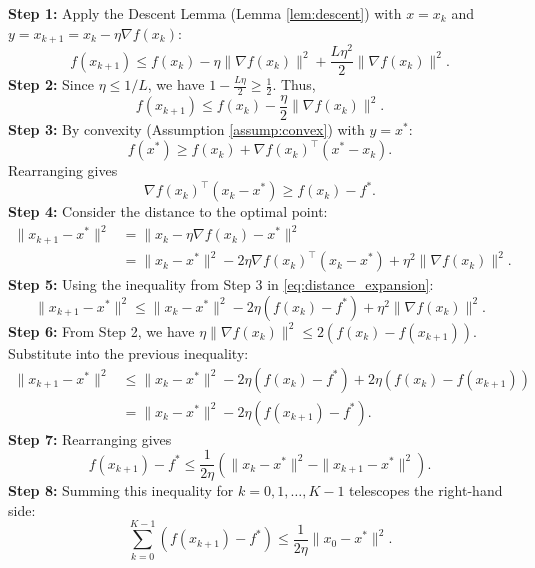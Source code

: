 \documentclass{article}
\begin{document}
\textbf{Step 1:} Apply the Descent Lemma (Lemma \ref{lem:descent}) with $x = x_k$ and $y = x_{k+1} = x_k - \eta \nabla f(x_k)$:
\begin{equation} \label{eq:descent_step}
    f(x_{k+1}) \le f(x_k) - \eta \|\nabla f(x_k)\|^2 + \frac{L \eta^2}{2} \|\nabla f(x_k)\|^2.
\end{equation}
\textbf{Step 2:} Since $\eta \le 1/L$, we have $1 - \frac{L\eta}{2} \ge \frac{1}{2}$. Thus,
\begin{equation} \label{eq:descent_simplified}
    f(x_{k+1}) \le f(x_k) - \frac{\eta}{2} \|\nabla f(x_k)\|^2.
\end{equation}
\textbf{Step 3:} By convexity (Assumption \ref{assump:convex}) with $y = x^*$:
\begin{equation} \label{eq:convexity}
    f(x^*) \ge f(x_k) + \nabla f(x_k)^\top (x^* - x_k).
\end{equation}
Rearranging gives
\begin{equation}
    \nabla f(x_k)^\top (x_k - x^*) \ge f(x_k) - f^*.
\end{equation}
\textbf{Step 4:} Consider the distance to the optimal point:
\begin{align}
    \|x_{k+1} - x^*\|^2 &= \|x_k - \eta \nabla f(x_k) - x^*\|^2 \\
    &= \|x_k - x^*\|^2 - 2\eta \nabla f(x_k)^\top (x_k - x^*) + \eta^2 \|\nabla f(x_k)\|^2. \label{eq:distance_expansion}
\end{align}
\textbf{Step 5:} Using the inequality from Step 3 in \eqref{eq:distance_expansion}:
\begin{equation}
    \|x_{k+1} - x^*\|^2 \le \|x_k - x^*\|^2 - 2\eta (f(x_k) - f^*) + \eta^2 \|\nabla f(x_k)\|^2.
\end{equation}
\textbf{Step 6:} From Step 2, we have $\eta \|\nabla f(x_k)\|^2 \le 2(f(x_k) - f(x_{k+1}))$. Substitute into the previous inequality:
\begin{align}
    \|x_{k+1} - x^*\|^2 &\le \|x_k - x^*\|^2 - 2\eta (f(x_k) - f^*) + 2\eta (f(x_k) - f(x_{k+1})) \\
    &= \|x_k - x^*\|^2 - 2\eta (f(x_{k+1}) - f^*).
\end{align}
\textbf{Step 7:} Rearranging gives
\begin{equation}
    f(x_{k+1}) - f^* \le \frac{1}{2\eta} \left( \|x_k - x^*\|^2 - \|x_{k+1} - x^*\|^2 \right).
\end{equation}
\textbf{Step 8:} Summing this inequality for $k = 0, 1, \dots, K-1$ telescopes the right-hand side:
\begin{equation}
    \sum_{k=0}^{K-1} (f(x_{k+1}) - f^*) \le \frac{1}{2\eta} \|x_0 - x^*\|^2.
\end{equation}
\end{document}

